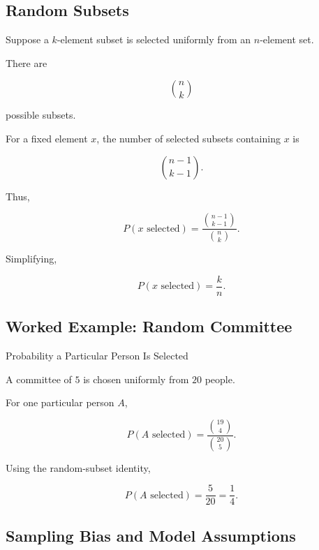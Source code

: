 \subsection{Random Subsets}
\label{subsec:elementary-random-subsets}

Suppose a \(k\)-element subset is selected uniformly from an
\(n\)-element set.

There are

\[
\binom nk
\]

possible subsets.

For a fixed element \(x\), the number of selected subsets containing
\(x\) is

\[
\binom{n-1}{k-1}.
\]

Thus,

\[
P(x\text{ selected})
=
\frac{
\binom{n-1}{k-1}
}{
\binom nk
}.
\]

Simplifying,

\[
\boxed{
P(x\text{ selected})
=
\frac{k}{n}.
}
\]

\subsection{Worked Example: Random Committee}
\label{subsec:worked-random-committee}

\begin{workedexamplebox}{Probability a Particular Person Is Selected}

A committee of \(5\) is chosen uniformly from \(20\) people.

For one particular person \(A\),

\[
P(A\text{ selected})
=
\frac{
\binom{19}{4}
}{
\binom{20}{5}
}.
\]

Using the random-subset identity,

\begin{answerbox}
\[
\boxed{
P(A\text{ selected})
=
\frac5{20}
=
\frac14.
}
\]
\end{answerbox}

\end{workedexamplebox}

\subsection{Sampling Bias and Model Assumptions}
\label{subsec:probability-model-assumptions}

